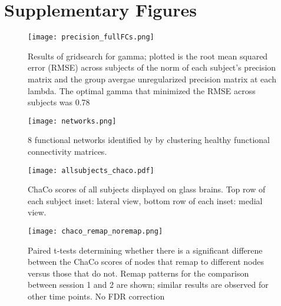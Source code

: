 \documentclass[10pt]{article}
\begin{document}
\clearpage
	
\section*{Supplementary Figures}
\begin{figure}[h] %
	\begin{center}
		\texttt{[image: precision\_fullFCs.png]}
		\caption{Results of gridsearch for gamma; plotted is the root mean squared error (RMSE) across subjects of the norm of each subject's precision matrix and the group avergae unregularized precision matrix at each lambda. The optimal gamma that minimized the RMSE across subjects was 0.78}
		\centering
		\label{precision}
	\end{center}
\end{figure}

\begin{figure}[h] %
	\begin{center}
	\texttt{[image: networks.png]}
	\caption{8 functional networks identified by \cite{Finn2015-er} by clustering healthy functional connectivity matrices.}
	\centering	
	\label{networks}
	\end{center}
\end{figure}

\begin{figure}[h] %
		\texttt{[image: allsubjects\_chaco.pdf]}
		\caption{ChaCo scores of all subjects displayed on glass brains. Top row of each subject inset: lateral view, bottom row of each inset: medial view.}
		\label{chacoscores}
		\centering
\end{figure}

\begin{figure}[h] %
	\texttt{[image: chaco\_remap\_noremap.png]}
	\caption{Paired t-tests determining whether there is a significant differene between the ChaCo scores of nodes that remap to different nodes versus those that do not. Remap patterns for the comparison between session 1 and 2 are shown; similar results are observed for other time points. No FDR correction}	\centering
	\label{chaco_remap_noremap}
\end{figure}
	
\end{document}
